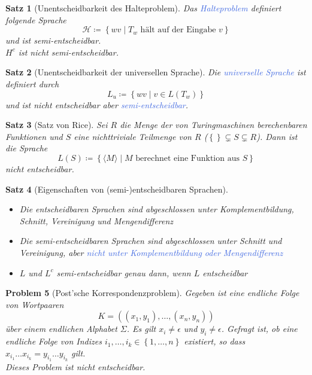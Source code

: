 \documentclass[11pt]{scrartcl}
\newcommand{\tcol}[1]{\textcolor{RoyalBlue}{#1}}
\newcommand{\set}[1]{\left\lbrace #1\right\rbrace}
\theoremstyle{break}
\newtheorem{satz}{Satz}[section]
\newtheorem{prob}[satz]{Problem}
\begin{document}
    \begin{satz}[Unentscheidbarkeit des Halteproblem]
        Das \tcol{Halteproblem} definiert folgende Sprache
        \[\mathcal{H}\coloneqq\set{wv\mid T_w\text{ hält auf der Eingabe }v}\]
        und ist semi-entscheidbar.\\
        $H^c$ ist nicht semi-entscheidbar.
    \end{satz}

    \begin{satz}[Unentscheidbarkeit der universellen Sprache]
        Die \tcol{universelle Sprache} ist definiert durch
        \[L_u\coloneqq\set{wv\mid v\in L(T_w)}\]
        und ist nicht entscheidbar aber \tcol{semi-entscheidbar}.
    \end{satz}

    \begin{satz}[Satz von Rice]
        Sei $R$ die Menge der von Turingmaschinen berechenbaren Funktionen und $S$ eine nichttriviale Teilmenge von $R$ ($\set{}\subsetneq S\subsetneq R$).
        Dann ist die Sprache \[L(S)\coloneqq\set{\langle M\rangle\mid M\text{ berechnet eine Funktion aus }S}\]
        nicht entscheidbar.
    \end{satz}

    \begin{satz}[Eigenschaften von (semi-)entscheidbaren Sprachen]
        \begin{itemize}
            \item Die entscheidbaren Sprachen sind abgeschlossen unter Komplementbildung, Schnitt, Vereinigung und Mengendifferenz
            \item Die semi-entscheidbaren Sprachen sind abgeschlossen unter Schnitt und Vereinigung, aber \tcol{nicht unter Komplementbildung oder Mengendifferenz}
            \item $L$ und $L^c$ semi-entscheidbar genau dann, wenn $L$ entscheidbar
        \end{itemize}
    \end{satz}

    \begin{prob}[Post'sche Korrespondenzproblem]
        Gegeben ist eine endliche Folge von Wortpaaren
        \[K=((x_1,y_1),\dots,(x_n,y_n))\]
        über einem endlichen Alphabet $\Sigma$.
        Es gilt $x_i\neq\epsilon$ und $y_i\neq\epsilon$.
        Gefragt ist, ob eine endliche Folge von Indizes $i_1,\dots,i_k\in\set{1,\dots,n}$ existiert, so dass $x_{i_1}\dots x_{i_k}=y_{i_1}\dots y_{i_k}$ gilt.\\
        Dieses Problem ist nicht entscheidbar.
    \end{prob}
\end{document}
